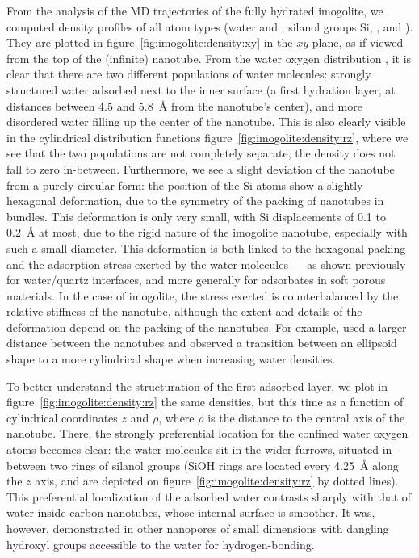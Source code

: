 \documentclass[thesis]{subfiles}
\begin{document}
From the analysis of the MD trajectories of the fully hydrated imogolite, we
computed density profiles of all atom types (water  and ;
silanol groups Si, , and ). They are plotted in
figure~\ref{fig:imogolite:density:xy} in the $xy$ plane, \ie as if viewed from
the top of the (infinite) nanotube. From the water oxygen distribution ,
it is clear that there are two different populations of water molecules:
strongly structured water adsorbed next to the inner surface (a first hydration
layer, at distances between 4.5 and \SI{5.8}{\AA} from the nanotube's center),
and more disordered water filling up the center of the nanotube. This is also
clearly visible in the cylindrical distribution functions
figure~\ref{fig:imogolite:density:rz}, where we see that the two populations are
not completely separate, \ie the density does not fall to zero in-between.
Furthermore, we see a slight deviation of the nanotube from a purely circular
form: the position of the Si atoms show a slightly hexagonal deformation, due to
the symmetry of the packing of nanotubes in bundles\cite{Amara2014}. This
deformation is only very small, with Si displacements of 0.1 to \SI{0.2}{\AA} at
most, due to the rigid nature of the imogolite nanotube, especially with such a
small diameter. This deformation is both linked to the hexagonal packing and the
adsorption stress exerted by the water molecules --- as shown previously for
water/quartz interfaces\cite{Gor2016}, and more generally for adsorbates in soft
porous materials\cite{Neimark2009, Mouhat2015}. In the case of imogolite, the
stress exerted is counterbalanced by the relative stiffness of the nanotube,
although the extent and details of the deformation depend on the packing of the
nanotubes. For example\citeauthor{Creton2008}\cite{Creton2008}, used a larger
distance between the nanotubes and observed a transition between an ellipsoid
shape to a more cylindrical shape when increasing water densities.

To better understand the structuration of the first adsorbed layer, we plot in
figure~\ref{fig:imogolite:density:rz} the same densities, but this time as a
function of cylindrical coordinates $z$ and $\rho$, where $\rho$ is the distance
to the central axis of the nanotube. There, the strongly preferential location
for the confined water oxygen atoms becomes clear: the water molecules sit in
the wider furrows, situated in-between two rings of silanol groups (SiOH rings
are located every \SI{4.25}{\AA} along the $z$ axis, and are depicted on
figure~\ref{fig:imogolite:density:rz} by dotted lines). This preferential
localization of the adsorbed water contrasts sharply with that of water inside
carbon nanotubes, whose internal surface is smoother. It was, however,
demonstrated in other nanopores of small dimensions with dangling hydroxyl
groups accessible to the water for hydrogen-bonding\cite{Haigis2013}.
\end{document}
